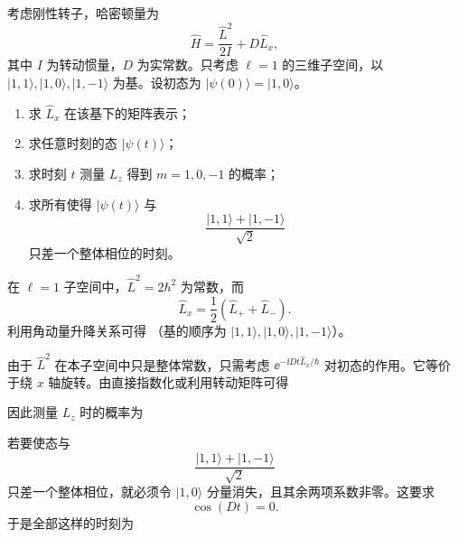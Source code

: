 \begin{question}
考虑刚性转子，哈密顿量为
\[
\hat H=\frac{\hat L^2}{2I}+D\hat L_x,
\]
其中 $I$ 为转动惯量，$D$ 为实常数。只考虑 $\ell=1$ 的三维子空间，以 $|1,1\rangle,|1,0\rangle,|1,-1\rangle$ 为基。设初态为 $|\psi(0)\rangle=|1,0\rangle$。

\begin{enumerate}[label=(\arabic*),leftmargin=2.5em]
  \item 求 $\hat L_x$ 在该基下的矩阵表示；
  \item 求任意时刻的态 $|\psi(t)\rangle$；
  \item 求时刻 $t$ 测量 $L_z$ 得到 $m=1,0,-1$ 的概率；
  \item 求所有使得 $|\psi(t)\rangle$ 与
  \[
  \frac{|1,1\rangle+|1,-1\rangle}{\sqrt2}
  \]
  只差一个整体相位的时刻。
\end{enumerate}

\begin{solution}
在 $\ell=1$ 子空间中，$\hat L^2=2\hbar^2$ 为常数，而
\[
\hat L_x=\frac12(\hat L_++\hat L_-).
\]
利用角动量升降关系可得
（基的顺序为 $|1,1\rangle,|1,0\rangle,|1,-1\rangle$）。

由于 $\hat L^2$ 在本子空间中只是整体常数，只需考虑 $\ee^{-\ii Dt\hat L_x/\hbar}$ 对初态的作用。它等价于绕 $x$ 轴旋转。由直接指数化或利用转动矩阵可得

因此测量 $L_z$ 时的概率为

若要使态与
\[
\frac{|1,1\rangle+|1,-1\rangle}{\sqrt2}
\]
只差一个整体相位，就必须令 $|1,0\rangle$ 分量消失，且其余两项系数非零。这要求
\[
\cos(Dt)=0.
\]
于是全部这样的时刻为
\end{solution}
\end{question}

